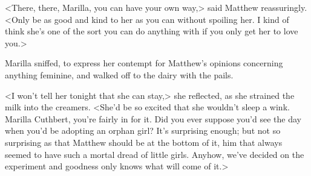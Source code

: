 <There, there, Marilla, you can have your own way,> said Matthew reassuringly. <Only be as good and kind to her as you can without spoiling her. I kind of think she's one of the sort you can do anything with if you only get her to love you.>

Marilla sniffed, to express her contempt for Matthew's opinions concerning anything feminine, and walked off to the dairy with the pails.

<I won't tell her tonight that she can stay,> she reflected, as she strained the milk into the creamers. <She'd be so excited that she wouldn't sleep a wink. Marilla Cuthbert, you're fairly in for it. Did you ever suppose you'd see the day when you'd be adopting an orphan girl? It's surprising enough; but not so surprising as that Matthew should be at the bottom of it, him that always seemed to have such a mortal dread of little girls. Anyhow, we've decided on the experiment and goodness only knows what will come of it.>